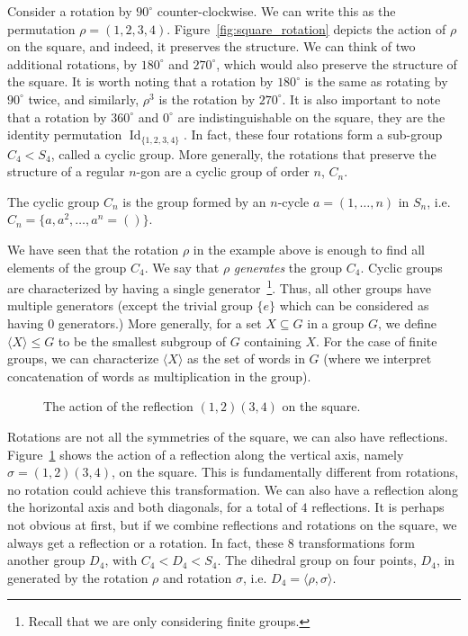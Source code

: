 Consider a rotation by $90^\circ$ counter-clockwise. We can write this as the permutation $\rho = (1,2,3,4)$. 
Figure~\ref{fig:square_rotation} depicts the action of $\rho$ on the square, and indeed, it preserves the structure.
We can think of two additional rotations, by $180^\circ$ and $270^\circ$, which would also preserve the structure of the square.
It is worth noting that a rotation by $180^\circ$ is the same as rotating by $90^\circ$ twice, and similarly, $\rho^3$ is the rotation by $270^\circ$.
It is also important to note that a rotation by $360^\circ$ and $0^\circ$ are indistinguishable on the square, they are the identity permutation $\operatorname{Id}_{\{1,2,3,4\}}$.
In fact, these four rotations form a sub-group $C_4 < S_4$, called a cyclic group. More generally, the rotations that preserve the structure of a regular $n$-gon are a cyclic group of order $n$, $C_n$.

\begin{defn}
     The cyclic group $C_n$ is the group formed by an $n$-cycle $a = (1,\ldots,n)$ in $S_n$, i.e. $C_n  = \{ a, a^2, \ldots, a^n = () \}$.
\end{defn}

We have seen that the rotation $\rho$ in the example above is enough to find all elements of the group $C_4$.
We say that $\rho$ \emph{generates} the group $C_4$.
Cyclic groups are characterized by having a single generator~\footnote{Recall that we are only considering finite groups.}.
Thus, all other groups have multiple generators (except the trivial group $\{ e \}$ which can be considered as having $0$ generators.)
More generally, for a set $X \subseteq G$ in a group $G$, we define $\langle X \rangle \leq G$ to be the smallest subgroup of $G$ containing $X$. 
For the case of finite groups, we can characterize $\langle X \rangle$ as the set of words in $G$ (where we interpret concatenation of words as multiplication in the group).

\begin{figure}[h]
	\centering
\resizebox{0.3\textwidth}{!}{
   \begin{tikzpicture}
     
   \end{tikzpicture}
 }
   \caption{The action of the reflection $(1,2)(3,4)$ on the square.}
   \label{fig:square_reflection}
\end{figure}

Rotations are not all the symmetries of the square, we can also have reflections. 
Figure~\ref{fig:square_reflection} shows the action of a reflection along the vertical axis, namely $\sigma = (1,2)(3,4)$, on the square. 
This is fundamentally different from rotations, no rotation could achieve this transformation.
We can also have a reflection along the horizontal axis and both diagonals, for a total of $4$ reflections.
It is perhaps not obvious at first, but if we combine reflections and rotations on the square, we always get a reflection or a rotation.
In fact, these $8$ transformations form another group $D_4$, with $C_4 < D_4 < S_4$.
The dihedral group on four points, $D_4$, in generated by the rotation $\rho$ and rotation $\sigma$, i.e. $D_4 = \langle \rho, \sigma \rangle$.

